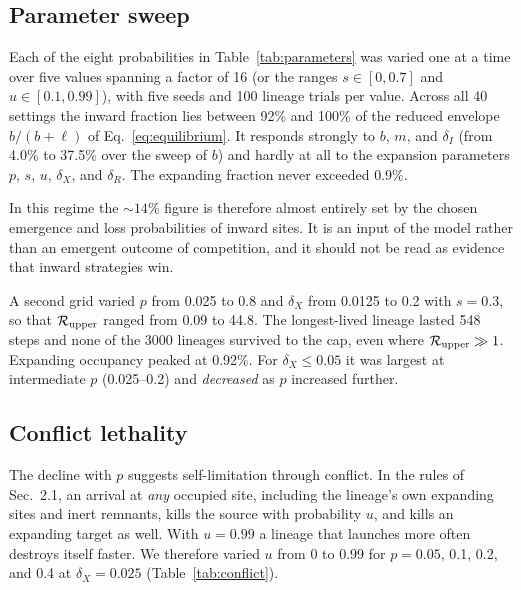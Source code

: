\documentclass[10pt,twocolumn]{article}
\begin{document}
\subsection{Parameter sweep}
Each of the eight probabilities in Table~\ref{tab:parameters} was varied
one at a time over five values spanning a factor of 16 (or the ranges
$s\in[0,0.7]$ and $u\in[0.1,0.99]$), with five seeds and 100 lineage
trials per value. Across all 40 settings the inward fraction lies
between 92\% and 100\% of the reduced envelope $b/(b+\ell)$ of
Eq.~\ref{eq:equilibrium}. It responds strongly to $b$, $m$, and
$\delta_I$ (from 4.0\% to 37.5\% over the sweep of $b$) and hardly at all
to the expansion parameters $p$, $s$, $u$, $\delta_X$, and $\delta_R$.
The expanding fraction never exceeded 0.9\%.

In this regime the $\sim14\%$ figure is therefore almost entirely set by
the chosen emergence and loss probabilities of inward sites. It is an
input of the model rather than an emergent outcome of competition, and
it should not be read as evidence that inward strategies win.

A second grid varied $p$ from 0.025 to 0.8 and $\delta_X$ from 0.0125
to 0.2 with $s=0.3$, so that $\mathcal R_{\rm upper}$ ranged from 0.09
to 44.8. The longest-lived lineage lasted 548 steps and none of the 3000
lineages survived to the cap, even where $\mathcal R_{\rm upper}\gg1$.
Expanding occupancy peaked at 0.92\%. For $\delta_X\le0.05$ it was
largest at intermediate $p$ (0.025--0.2) and \emph{decreased} as $p$
increased further.

\subsection{Conflict lethality}
The decline with $p$ suggests self-limitation through conflict. In the
rules of Sec.~2.1, an arrival at \emph{any} occupied site, including
the lineage's own expanding sites and inert remnants, kills the source
with probability $u$, and kills an expanding target as well. With
$u=0.99$ a lineage that launches more often destroys itself faster.
We therefore varied $u$ from 0 to 0.99 for $p=0.05$, 0.1, 0.2, and 0.4
at $\delta_X=0.025$ (Table~\ref{tab:conflict}).
\end{document}
